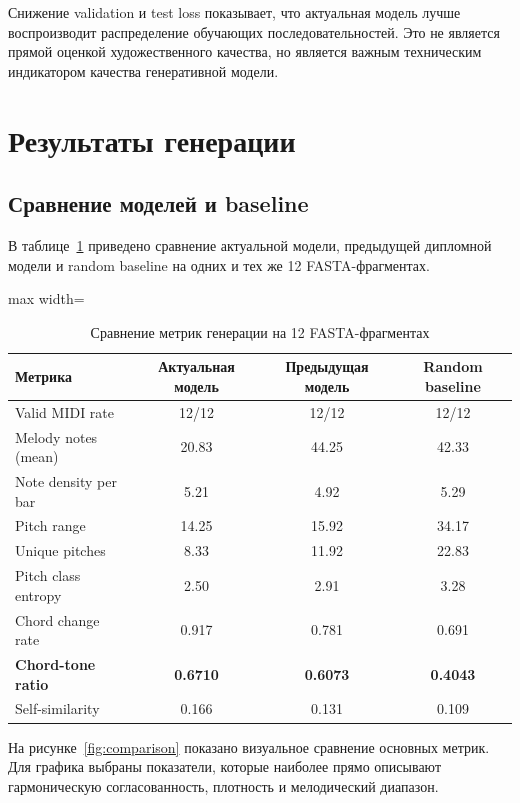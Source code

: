 Снижение validation и test loss показывает, что актуальная модель лучше воспроизводит распределение обучающих последовательностей. Это не является прямой оценкой художественного качества, но является важным техническим индикатором качества генеративной модели.

\section{Результаты генерации}

\subsection{Сравнение моделей и baseline}

В таблице~\ref{tab:evaluation} приведено сравнение актуальной модели, предыдущей дипломной модели и random baseline на одних и тех же 12 FASTA-фрагментах.

\begin{table}[htbp]
\centering
\caption{Сравнение метрик генерации на 12 FASTA-фрагментах}
\label{tab:evaluation}
\begin{adjustbox}{max width=\textwidth}
\begin{tabular}{|l|c|c|c|}
\hline
\textbf{Метрика} & \textbf{Актуальная модель} & \textbf{Предыдущая модель} & \textbf{Random baseline} \\
\hline
Valid MIDI rate & 12/12 & 12/12 & 12/12 \\
\hline
Melody notes (mean) & 20.83 & 44.25 & 42.33 \\
\hline
Note density per bar & 5.21 & 4.92 & 5.29 \\
\hline
Pitch range & 14.25 & 15.92 & 34.17 \\
\hline
Unique pitches & 8.33 & 11.92 & 22.83 \\
\hline
Pitch class entropy & 2.50 & 2.91 & 3.28 \\
\hline
Chord change rate & 0.917 & 0.781 & 0.691 \\
\hline
\textbf{Chord-tone ratio} & \textbf{0.6710} & \textbf{0.6073} & \textbf{0.4043} \\
\hline
Self-similarity & 0.166 & 0.131 & 0.109 \\
\hline
\end{tabular}
\end{adjustbox}
\end{table}

На рисунке~\ref{fig:comparison} показано визуальное сравнение основных метрик. Для графика выбраны показатели, которые наиболее прямо описывают гармоническую согласованность, плотность и мелодический диапазон.

